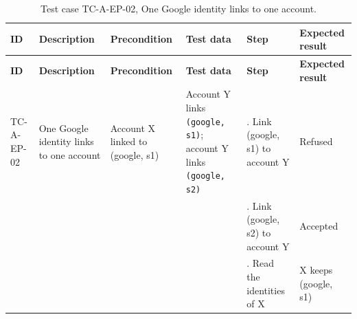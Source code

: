 {\footnotesize{}\renewcommand{\arraystretch}{1.1}
\begin{longtable}{|>{\raggedright\arraybackslash}p{}|>{\raggedright\arraybackslash}p{}|>{\raggedright\arraybackslash}p{}|>{\raggedright\arraybackslash}p{}|>{\raggedright\arraybackslash}p{}|>{\raggedright\arraybackslash}p{}|}
\caption{Test case TC-A-EP-02, One Google identity links to one account.} \\
\hline
\textbf{ID} & \textbf{Description} & \textbf{Precondition} & \textbf{Test data} & \textbf{Step} & \textbf{Expected result} \\ \hline
\endfirsthead
\hline
\textbf{ID} & \textbf{Description} & \textbf{Precondition} & \textbf{Test data} & \textbf{Step} & \textbf{Expected result} \\ \hline
\endhead
TC-A-EP-02 & One Google identity links to one account & Account X linked to (google, s1) & Account Y links \texttt{(google, s1)}; account Y links \texttt{(google, s2)} & 1. Link (google, s1) to account Y & Refused \\ \cline{5-6}
 &  &  &  & 2. Link (google, s2) to account Y & Accepted \\ \cline{5-6}
 &  &  &  & 3. Read the identities of X & X keeps (google, s1) \\ \hline
\end{longtable}
}

